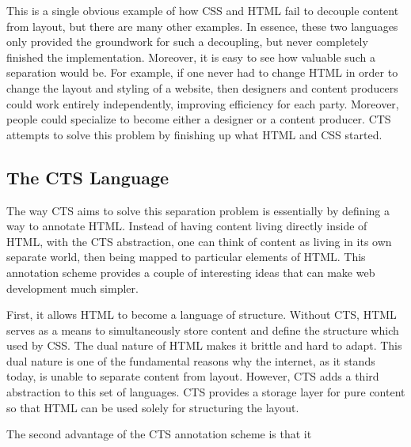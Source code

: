 \documentclass[12pt]{article}
\begin{document}
This is a single obvious example of how CSS and HTML fail to decouple content from layout, but there are many other examples. In essence, these two languages only provided the groundwork for such a decoupling, but never completely finished the implementation. Moreover, it is easy to see how valuable such a separation would be. For example, if one never had to change HTML in order to change the layout and styling of a website, then designers and content producers could work entirely independently, improving efficiency for each party. Moreover, people could specialize to become either a designer or a content producer. CTS attempts to solve this problem by finishing up what HTML and CSS started.

\subsection{The CTS Language}

The way CTS aims to solve this separation problem is essentially by defining a way to annotate HTML. Instead of having content living directly inside of HTML, with the CTS abstraction, one can think of content as living in its own separate world, then being mapped to particular elements of HTML. This annotation scheme provides a couple of interesting ideas that can make web development much simpler.

First, it allows HTML to become a language of structure. Without CTS, HTML serves as a means to simultaneously store content and define the structure which used by CSS. The dual nature of HTML makes it brittle and hard to adapt. This dual nature is one of the fundamental reasons why the internet, as it stands today, is unable to separate content from layout. However, CTS adds a third abstraction to this set of languages. CTS provides a storage layer for pure content so that HTML can be used solely for structuring the layout.

The second advantage of the CTS annotation scheme is that it 
\end{document}
